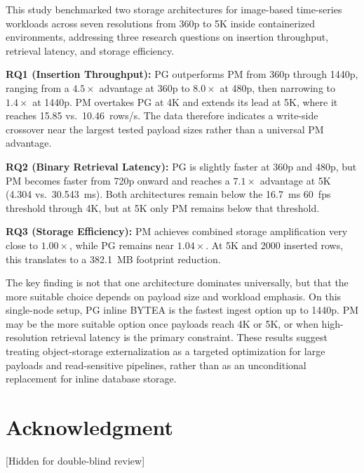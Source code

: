 \documentclass[conference]{IEEEtran}
\begin{document}
This study benchmarked two storage architectures for image-based time-series workloads across seven resolutions from 360p to 5K inside containerized environments, addressing three research questions on insertion throughput, retrieval latency, and storage efficiency.

\textbf{RQ1 (Insertion Throughput):} PG outperforms PM from 360p through 1440p, ranging from a $4.5\times$ advantage at 360p to $8.0\times$ at 480p, then narrowing to $1.4\times$ at 1440p. PM overtakes PG at 4K and extends its lead at 5K, where it reaches 15.85 vs.\ 10.46~rows/s. The data therefore indicates a write-side crossover near the largest tested payload sizes rather than a universal PM advantage.

\textbf{RQ2 (Binary Retrieval Latency):} PG is slightly faster at 360p and 480p, but PM becomes faster from 720p onward and reaches a $7.1\times$ advantage at 5K (4.304 vs.\ 30.543~ms). Both architectures remain below the 16.7~ms 60~fps threshold through 4K, but at 5K only PM remains below that threshold.

\textbf{RQ3 (Storage Efficiency):} PM achieves combined storage amplification very close to $1.00\times$, while PG remains near $1.04\times$. At 5K and 2000 inserted rows, this translates to a 382.1~MB footprint reduction.

The key finding is not that one architecture dominates universally, but that the more suitable choice depends on payload size and workload emphasis. On this single-node setup, PG inline BYTEA is the fastest ingest option up to 1440p. PM may be the more suitable option once payloads reach 4K or 5K, or when high-resolution retrieval latency is the primary constraint. These results suggest treating object-storage externalization as a targeted optimization for large payloads and read-sensitive pipelines, rather than as an unconditional replacement for inline database storage.


\section*{Acknowledgment}
[Hidden for double-blind review]




\end{document}
